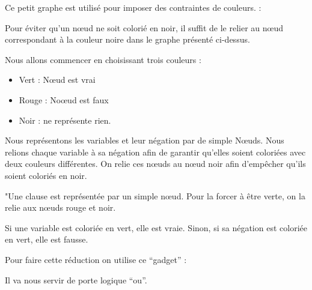 \documentclass{article}
\begin{document}
  \begin{multicols}{5}

    Ce petit graphe est utilisé pour imposer des contraintes de couleurs. :

    \noindent\begin{minipage}{\linewidth}
    \centering
    \end{minipage}

    Pour éviter qu'un n\oe ud ne soit colorié en noir,
    il suffit de le relier au n\oe ud correspondant à la couleur 
    noire dans le graphe présenté ci-dessus.

    Nous allons commencer en choisissant trois couleurs :
    \begin{itemize}
      \item Vert : N\oe ud est vrai
      \item Rouge : No\oe ud est faux
      \item Noir : ne représente rien.
    \end{itemize}

    \columnbreak

    Nous représentons les variables et leur négation 
    par de simple N\oe uds. Nous relions chaque 
    variable à sa négation afin de garantir qu'elles 
    soient coloriées avec deux couleurs différentes.
    On relie ces n\oe uds au nœud noir afin d'empêcher 
    qu'ils soient coloriés en noir.

    "Une clause est représentée par un simple n\oe ud. 
    Pour la forcer à être verte, on la relie aux nœuds rouge et noir.

    Si une variable est coloriée en vert, elle est vraie. 
    Sinon, si sa négation est coloriée en vert, elle est fausse.
    \columnbreak


    Pour faire cette réduction on utilise ce ``gadget'' :

  \noindent\begin{minipage}{\linewidth}
    \centering
    \end{minipage}
    Il va nous servir de porte logique ``ou''.


\end{multicols}
\end{document}
